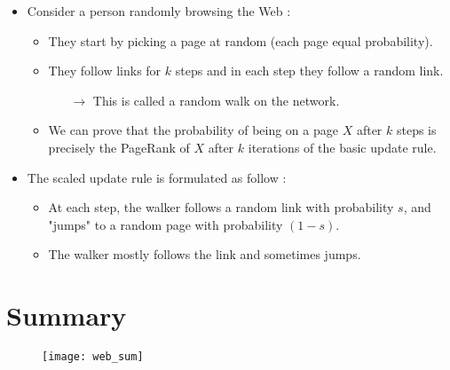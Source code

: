 \begin{itemize}
\item Consider a person randomly browsing the Web :
	\begin{itemize}
	\item They start by picking a page at random (each page equal probability).
	\item They follow links for $k$ steps and in each step they follow a random link.
		\begin{itemize}
		\item[$\rightarrow$] This is called a random walk on the network.
		\end{itemize}
	\item We can prove that the probability of being on a page $X$ after $k$ steps is precisely the PageRank of $X$ after $k$ iterations of the basic update rule.
	\end{itemize}
\item The scaled update rule is formulated as follow :
	\begin{itemize}
	\item At each step, the walker follows a random link with probability $s$, and "jumps" to a random page with probability $(1-s)$.
	\item The walker mostly follows the link and sometimes jumps.
	\end{itemize}
\end{itemize}

\section{Summary}

\begin{figure}[H]
    \centering
    \texttt{[image: web\_sum]}
\end{figure}
